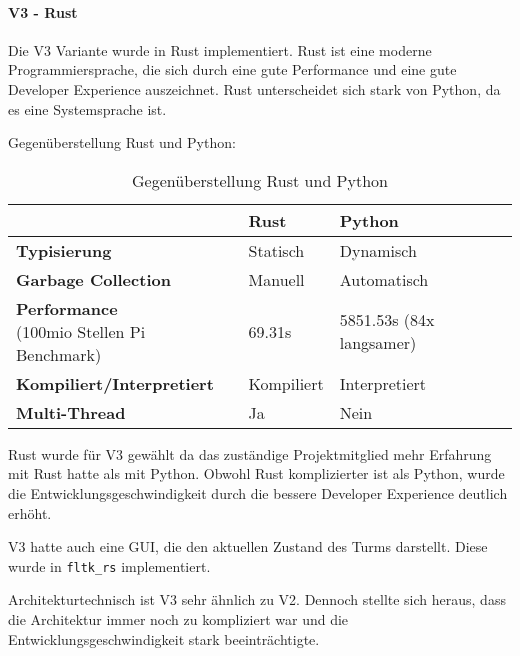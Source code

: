 \paragraph{V3 - Rust}
Die V3 Variante wurde in Rust implementiert. Rust ist eine moderne Programmiersprache, die sich durch eine gute Performance und eine gute Developer Experience auszeichnet. Rust unterscheidet sich stark von Python, da es eine Systemsprache ist.

Gegenüberstellung Rust und Python:
\begin{table}[ht]
  \begin{tabular}{l|l|l}
                                      & \textbf{Rust} & \textbf{Python}          \\
    \hline
    \textbf{Typisierung}              & Statisch      & Dynamisch                \\
    \textbf{Garbage Collection}       & Manuell       & Automatisch              \\
    \makecell[l]{\textbf{Performance }                                           \\(100mio Stellen Pi Benchmark\cite{programming_language_speeds})}
                                      & 69.31s        & 5851.53s (84x langsamer) \\
    \textbf{Kompiliert/Interpretiert} & Kompiliert    & Interpretiert            \\
    \textbf{Multi-Thread}             & Ja            & Nein                     \\
  \end{tabular}
  \caption{Gegenüberstellung Rust und Python}
  \label{tab:rust_vs_python}
\end{table}

Rust wurde für V3 gewählt da das zuständige Projektmitglied mehr Erfahrung mit Rust hatte als mit Python. Obwohl Rust komplizierter ist als Python, wurde die Entwicklungsgeschwindigkeit durch die bessere Developer Experience deutlich erhöht.

V3 hatte auch eine \ac{GUI}, die den aktuellen Zustand des Turms darstellt. Diese wurde in \texttt{fltk\_rs} implementiert.

Architekturtechnisch ist V3 sehr ähnlich zu V2. Dennoch stellte sich heraus, dass die Architektur immer noch zu kompliziert war und die Entwicklungsgeschwindigkeit stark beeinträchtigte.
